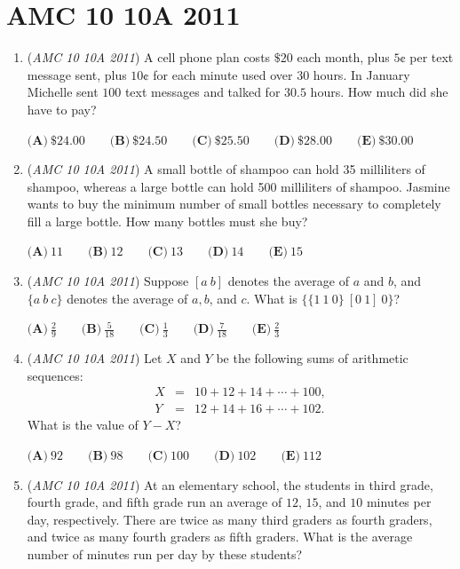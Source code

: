\section{AMC 10 10A 2011}
        \begin{enumerate}
        	\item (\textit{AMC 10 10A 2011}) A cell phone plan costs $\$20$ each month, plus $5$¢ per text message sent, plus $10$¢ for each minute used over $30$ hours. In January Michelle sent $100$ text messages and talked for $30.5$ hours. How much did she have to pay?


 $\textbf{(A)}\ \$ 24.00 \qquad\textbf{(B)}\ \$ 24.50 \qquad\textbf{(C)}\ \$ 25.50\qquad\textbf{(D)}\ \$ 28.00\qquad\textbf{(E)}\ \$ 30.00$


	\item (\textit{AMC 10 10A 2011}) A small bottle of shampoo can hold 35 milliliters of shampoo, whereas a large bottle can hold 500 milliliters of shampoo. Jasmine wants to buy the minimum number of small bottles necessary to completely fill a large bottle. How many bottles must she buy?


 $\textbf{(A)}\ 11 \qquad\textbf{(B)}\ 12 \qquad\textbf{(C)}\ 13\qquad\textbf{(D)}\ 14\qquad\textbf{(E)}\ 15$


	\item (\textit{AMC 10 10A 2011}) Suppose $[a\ b]$ denotes the average of $a$ and $b$, and $\{a\ b\ c\}$ denotes the average of $a, b$, and $c$. What is $\{\{1\ 1\ 0\}\ [0\ 1]\ 0\}$?


 $\textbf{(A)}\ \frac{2}{9} \qquad\textbf{(B)}\ \frac{5}{18} \qquad\textbf{(C)}\ \frac{1}{3} \qquad\textbf{(D)}\ \frac{7}{18} \qquad\textbf{(E)}\ \frac{2}{3}$


	\item (\textit{AMC 10 10A 2011}) Let $X$ and $Y$ be the following sums of arithmetic sequences: 
 \begin{eqnarray*} X &=& 10 + 12 + 14 + \cdots + 100, \\ Y &=& 12 + 14 + 16 + \cdots + 102. \end{eqnarray*} What is the value of $Y - X$?


 $\textbf{(A)}\ 92\qquad\textbf{(B)}\ 98\qquad\textbf{(C)}\ 100\qquad\textbf{(D)}\ 102\qquad\textbf{(E)}\ 112$


	\item (\textit{AMC 10 10A 2011}) At an elementary school, the students in third grade, fourth grade, and fifth grade run an average of $12$, $15$, and $10$ minutes per day, respectively. There are twice as many third graders as fourth graders, and twice as many fourth graders as fifth graders. What is the average number of minutes run per day by these students? 



\end{enumerate}
